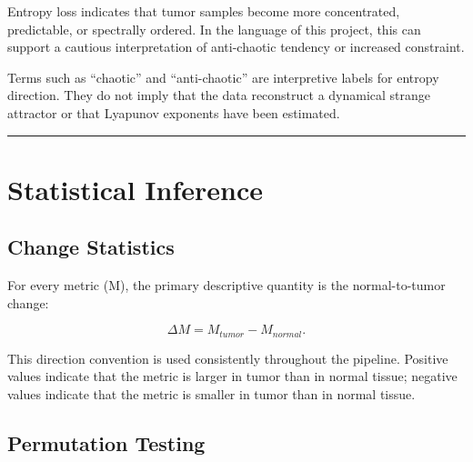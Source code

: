 \documentclass[
  letterpaper,
  DIV=11,
  numbers=noendperiod,
  openany,
  oneside]{scrreprt}
\begin{document}
Entropy loss indicates that tumor samples become more concentrated,
predictable, or spectrally ordered. In the language of this project,
this can support a cautious interpretation of anti-chaotic tendency or
increased constraint.

\begin{tcolorbox}[enhanced jigsaw, opacityback=0, colframe=quarto-callout-important-color-frame, toptitle=1mm, colback=white, breakable, toprule=.15mm, bottomrule=.15mm, opacitybacktitle=0.6, title=\textcolor{quarto-callout-important-color}{\faExclamation}\hspace{0.5em}{Important}, coltitle=black, rightrule=.15mm, leftrule=.75mm, left=2mm, bottomtitle=1mm, titlerule=0mm, colbacktitle=quarto-callout-important-color!10!white, arc=.35mm]

Terms such as ``chaotic'' and ``anti-chaotic'' are interpretive labels
for entropy direction. They do not imply that the data reconstruct a
dynamical strange attractor or that Lyapunov exponents have been
estimated.

\end{tcolorbox}

\begin{center}\rule{0.5\linewidth}{0.5pt}\end{center}

\section{Statistical Inference}\label{statistical-inference}

\subsection{Change Statistics}\label{change-statistics}

For every metric (M), the primary descriptive quantity is the
normal-to-tumor change:

\[
\Delta M = M_{tumor} - M_{normal}.
\]

This direction convention is used consistently throughout the pipeline.
Positive values indicate that the metric is larger in tumor than in
normal tissue; negative values indicate that the metric is smaller in
tumor than in normal tissue.

\subsection{Permutation Testing}\label{permutation-testing}
\end{document}
